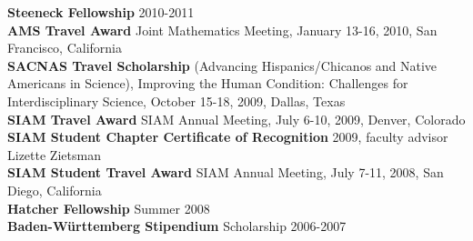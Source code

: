 \documentclass[10pt]{article}
\newenvironment{outerlist}[1][\enskip\textbullet]%
          {\begin{enumerate}[#1]}{\end{enumerate}%
           \vspace{-.6\baselineskip}}
\begin{document}
  \textbf{Steeneck Fellowship} 2010-2011\\

  \textbf{AMS Travel Award} Joint
    Mathematics Meeting, January 13-16, 2010, San Francisco, California \\

  \textbf{SACNAS Travel Scholarship} (Advancing Hispanics/Chicanos and Native Americans
  in Science), Improving the Human Condition: Challenges for Interdisciplinary
  Science, October 15-18, 2009, Dallas, Texas \\

  \textbf{SIAM Travel Award} SIAM Annual Meeting, July 6-10, 2009, Denver, Colorado \\

  \textbf{SIAM Student Chapter Certificate of Recognition} 2009, faculty advisor Lizette Zietsman \\

  \textbf{SIAM Student Travel Award} SIAM Annual Meeting, July
  7-11, 2008, San Diego, California \\

  \textbf{Hatcher Fellowship} Summer 2008 \\

  \textbf{Baden-W\"urttemberg Stipendium} Scholarship 2006-2007 \\

\end{document}
